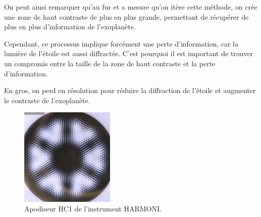On peut ainsi remarquer qu'au fur et a mesure qu'on itère cette méthode, on crée une zone de haut contraste de plus en plus grande, permettant de récupérer de plus en plus d'information de l'exoplanète.

Cependant, ce processus implique forcément une perte d'information, car la lumière de l'étoile est aussi diffractée. C'est pourquoi il est important de trouver un compromis entre la taille de la zone de haut contraste et la perte d'information.

En gros, on perd en résolution pour réduire la diffraction de l'étoile et augmenter le contraste de l'exoplanète.
\begin{figure}[htbp]
    \centering
    \includegraphics[width=0.4\textwidth]{figures/apod_harmoni.png}
    \caption{Apodiseur HC1 de l'instrument HARMONI.}%
\end{figure}

